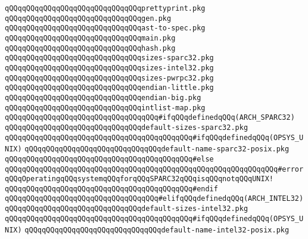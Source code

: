 \verb|qQQqqQQqqQQqqQQqqQQqqQQqqQQqqQQqprettyprint.pkg|\newline
\verb|qQQqqQQqqQQqqQQqqQQqqQQqqQQqqQQqgen.pkg|\newline
\verb|qQQqqQQqqQQqqQQqqQQqqQQqqQQqqQQqast-to-spec.pkg|\newline
\verb|qQQqqQQqqQQqqQQqqQQqqQQqqQQqqQQqmain.pkg|\newline
\verb|qQQqqQQqqQQqqQQqqQQqqQQqqQQqqQQqhash.pkg|\newline
\newline
\verb|qQQqqQQqqQQqqQQqqQQqqQQqqQQqqQQqsizes-sparc32.pkg|\newline
\verb|qQQqqQQqqQQqqQQqqQQqqQQqqQQqqQQqsizes-intel32.pkg|\newline
\verb|qQQqqQQqqQQqqQQqqQQqqQQqqQQqqQQqsizes-pwrpc32.pkg|\newline
\newline
\verb|qQQqqQQqqQQqqQQqqQQqqQQqqQQqqQQqendian-little.pkg|\newline
\verb|qQQqqQQqqQQqqQQqqQQqqQQqqQQqqQQqendian-big.pkg|\newline
\newline
\verb|qQQqqQQqqQQqqQQqqQQqqQQqqQQqqQQqintlist-map.pkg|\newline
\newline
\verb|qQQqqQQqqQQqqQQqqQQqqQQqqQQqqQQqqQQq#ifqQQqdefinedqQQq(ARCH_SPARC32)|\newline
\verb|qQQqqQQqqQQqqQQqqQQqqQQqqQQqqQQqdefault-sizes-sparc32.pkg|\newline
\verb|qQQqqQQqqQQqqQQqqQQqqQQqqQQqqQQqqQQqqQQqqQQq#ifqQQqdefinedqQQq(OPSYS_UNIX)|\newline
\verb|qQQqqQQqqQQqqQQqqQQqqQQqqQQqqQQqdefault-name-sparc32-posix.pkg|\newline
\verb|qQQqqQQqqQQqqQQqqQQqqQQqqQQqqQQqqQQqqQQqqQQq#else|\newline
\verb|qQQqqQQqqQQqqQQqqQQqqQQqqQQqqQQqqQQqqQQqqQQqqQQqqQQqqQQqqQQqqQQq#errorqQQqOperatingqQQqsystemqQQqforqQQqSPARC32qQQqisqQQqnotqQQqUNIX!|\newline
\verb|qQQqqQQqqQQqqQQqqQQqqQQqqQQqqQQqqQQqqQQqqQQq#endif|\newline
\verb|qQQqqQQqqQQqqQQqqQQqqQQqqQQqqQQqqQQq#elifqQQqdefinedqQQq(ARCH_INTEL32)|\newline
\verb|qQQqqQQqqQQqqQQqqQQqqQQqqQQqqQQqdefault-sizes-intel32.pkg|\newline
\verb|qQQqqQQqqQQqqQQqqQQqqQQqqQQqqQQqqQQqqQQqqQQq#ifqQQqdefinedqQQq(OPSYS_UNIX)|\newline
\verb|qQQqqQQqqQQqqQQqqQQqqQQqqQQqqQQqdefault-name-intel32-posix.pkg|\newline
